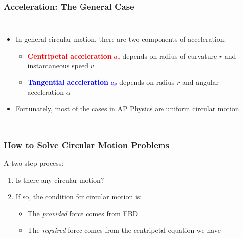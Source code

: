 \documentclass[12pt,compress,aspectratio=169]{beamer}
\newcommand{\mb}[1]{\ensuremath\mathbf{#1}}
\newcommand{\eq}[2]{\vspace{#1}{\Large\begin{displaymath}#2\end{displaymath}}}
\begin{document}
\begin{frame}
  \frametitle{Acceleration: The General Case}
  \begin{columns}
    
    \begin{itemize}
    \item In general circular motion, there are two components of acceleration:
      \begin{itemize}
      \item\textcolor{red}{\textbf{Centripetal acceleration} $a_c$} depends on
        radius of curvature $r$ and instantaneous speed $v$
      \item \textcolor{blue}{\textbf{Tangential acceleration} $a_\theta$}
        depends on radius $r$  and angular acceleration $\alpha$
      \end{itemize}
    \item Fortunately, most of the cases in AP Physics are uniform circular
      motion
    \end{itemize}
  \end{columns}
\end{frame}


\begin{frame}
  \frametitle{How to Solve Circular Motion Problems}

  A two-step process:
  \begin{enumerate}
  \item Is there any circular motion?
  \item If so, the condition for circular motion is:

    \eq{-.2in}{
      \mb{F}_\mathrm{provided}=\mb{F}_\mathrm{required}
    }
    \begin{itemize}
    \item The \emph{provided} force comes from FBD
    \item The \emph{required} force comes from the centripetal equation we have
    \end{itemize}
  \end{enumerate}
\end{frame}
\end{document}
